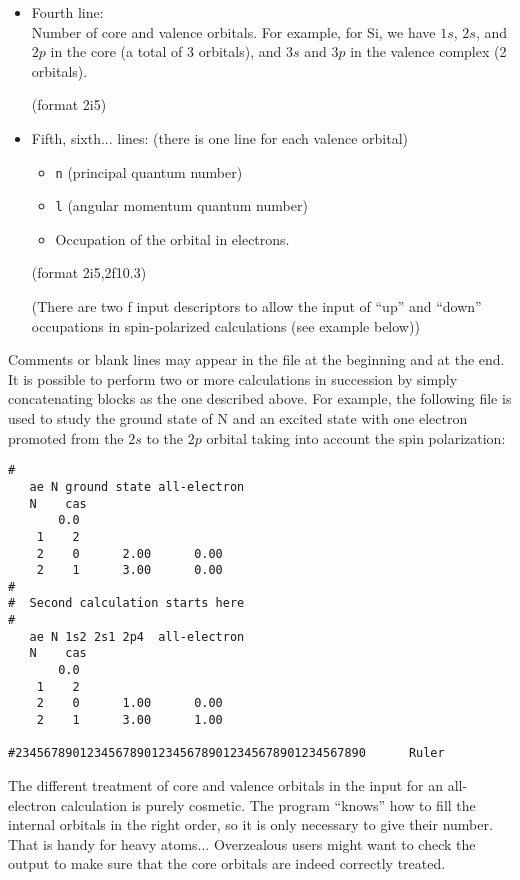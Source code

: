 \documentclass[11pt]{article}
\begin{document}
\begin{itemize} 

\item Fourth line:\\
	 Number of core and valence orbitals. For example, for Si, we
	have $1s$, $2s$, and $2p$ in the core (a total of 3 orbitals), and
	$3s$ and $3p$ in the valence complex (2 orbitals).

	(format 2i5)

\item Fifth, sixth... lines: (there is one line for each valence
orbital)
	\begin{itemize}
	\item {\tt n} (principal quantum number)
	\item {\tt l} (angular momentum quantum number)
	\item Occupation of the orbital in electrons. 
	\end{itemize}

	(format 2i5,2f10.3)

	(There are two f input descriptors to allow the input of ``up''
	and ``down'' occupations in spin-polarized calculations (see
	example below))

\end{itemize}

Comments or blank lines may appear in the file at the beginning and at the end.
It is possible to perform two or more calculations in
succession by simply concatenating blocks as the one described above.
For example, the following file is used to study the ground state of N
and an excited state with one electron promoted from the $2s$ to the $2p$
orbital taking into account the spin polarization:

\begin{verbatim}
#
   ae N ground state all-electron
   N    cas
       0.0
    1    2
    2    0      2.00      0.00
    2    1      3.00      0.00
#
#  Second calculation starts here
#
   ae N 1s2 2s1 2p4  all-electron
   N    cas
       0.0
    1    2
    2    0      1.00      0.00
    2    1      3.00      1.00

#2345678901234567890123456789012345678901234567890      Ruler
\end{verbatim}

	
The different treatment of core and valence orbitals in the input for an
all-electron calculation is purely cosmetic. The program ``knows'' how
to fill the internal orbitals in the right order, so it is only
necessary to give their number. That is handy for heavy atoms...
Overzealous users might want to check the output to make sure that the
core orbitals are indeed correctly treated.
\end{document}
